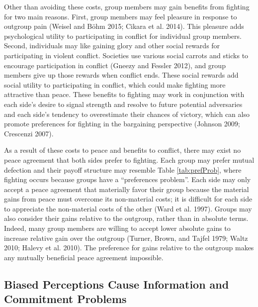 \documentclass[11pt]{article}
\begin{document}
Other than avoiding these costs, group members may gain benefits from
fighting for two main reasons. First, group members may feel pleasure in
response to outgroup pain (Weisel and Böhm 2015; Cikara et al. 2014).
This pleasure adds psychological utility to participating in conflict
for individual group members. Second, individuals may like gaining glory
and other social rewards for participating in violent conflict.
Societies use various social carrots and sticks to encourage
participation in conflict (Gneezy and Fessler 2012), and group members
give up those rewards when conflict ends. These social rewards add
social utility to participating in conflict, which could make fighting
more attractive than peace. These benefits to fighting may work in
conjunction with each side's desire to signal strength and resolve to
future potential adversaries and each side's tendency to overestimate
their chances of victory, which can also promote preferences for
fighting in the bargaining perspective (Johnson 2009; Crescenzi 2007).

As a result of these costs to peace and benefits to conflict, there may
exist no peace agreement that both sides prefer to fighting. Each group
may prefer mutual defection and their payoff structure may resemble
Table \ref{tab:prefProb}, where fighting occurs because groups have a
``preferences problem''. Each side may only accept a peace agreement
that materially favor their group because the material gains from peace
must overcome its non-material costs; it is difficult for each side to
appreciate the non-material costs of the other (Ward et al. 1997).
Groups may also consider their gains relative to the outgroup, rather
than in absolute terms. Indeed, many group members are willing to accept
lower absolute gains to increase relative gain over the outgroup
(Turner, Brown, and Tajfel 1979; Waltz 2010; Halevy et al. 2010). The
preference for gains relative to the outgroup makes any mutually
beneficial peace agreement impossible.

\hypertarget{biased-perceptions-cause-information-and-commitment-problems}{%
\subsection{Biased Perceptions Cause Information and Commitment
Problems}\label{biased-perceptions-cause-information-and-commitment-problems}}
\end{document}
